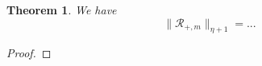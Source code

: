 \documentclass[letterpaper,11pt]{article}
\numberwithin{equation}{section}
\theoremstyle{plain}
\newtheorem{theorem}{Theorem}[section]
\begin{document}
\begin{enumerate}
\begin{itemize}
\begin{enumerate}
 \begin{theorem}
 We have
 \[
 \|\mathcal{R}_{+,m}\|_{\eta+1} = ...
 \]
 \end{theorem}
 
 \begin{proof}

 \end{proof}
\end{enumerate}

\end{itemize}

\end{enumerate}



\end{document}
